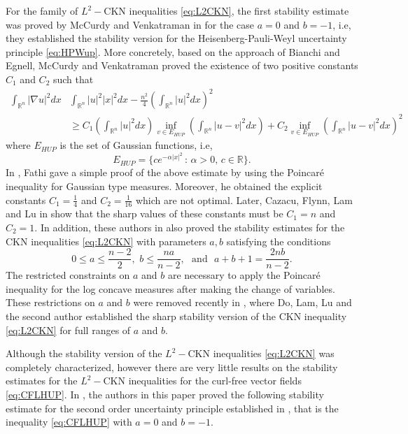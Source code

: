 \documentclass[a4paper,12pt]{article}
\theoremstyle{plain}
\theoremstyle{definition}
\theoremstyle{remark}
\def\R{\mathbb R}%
\def\lt{\left}%
\def\rt{\right}%
\numberwithin{equation}{section}
\begin{document}

For the family of $L^2-$CKN inequalities \eqref{eq:L2CKN}, the first stability estimate was proved by McCurdy and Venkatraman in \cite{MVNonA} for the case $a=0$ and $b=-1$, i.e, they established the stability version for the Heisenberg-Pauli-Weyl uncertainty principle \eqref{eq:HPWup}. More concretely, based on the approach of Bianchi and Egnell, McCurdy and Venkatraman proved the existence of two positive constants $C_1$ and $C_2$ such that
\begin{align*}
\int_{\R^n} |\nabla u|^2 dx &\int_{\R^n} |u|^2 |x|^2 dx - \frac{n^2}4 \lt(\int_{\R^n} |u|^2 dx\rt)^2\\
& \geq C_1 \lt(\int_{\R^n} |u|^2 dx\rt) \inf_{v\in E_{HUP}} \lt(\int_{\R^n} |u -v|^2 dx\rt) + C_2 \inf_{v\in E_{HUP}}\lt(\int_{\R^n} |u-v|^2 dx\rt)^2
\end{align*}
where $E_{HUP}$ is the set of Gaussian functions, i.e, 
\[
E_{HUP}= \{c e^{-\alpha |x|^2}\, :\, \alpha >0, \, c\in \R\}.
\]
In \cite{Fathi}, Fathi gave a simple proof of the above estimate by using the Poincar\'e inequality for Gaussian type measures. Moreover, he obtained the explicit constants $C_1 = \frac14$ and $C_2 = \frac1{16}$ which are not optimal. Later, Cazacu, Flynn, Lam and Lu in \cite{CFLL24} show that the sharp values of these constants must be $C_1 = n$ and $C_2 =1$. In addition, these authors in \cite{CFLL24} also proved the stability estimates for the CKN inequalities \eqref{eq:L2CKN} with parameters $a,b$ satisfying the conditions
\[
0\leq a\leq \frac{n-2}2,\,\, b \leq \frac{na}{n-2},\,\, \text{ and } \,\, a +b + 1 =\frac{2nb}{n-2}.
\] 
The restricted constraints on $a$ and $b$ are necessary to apply the Poincar\'e inequality for the log concave measures after making the change of variables. These restrictions on $a$ and $b$ were removed recently in \cite{DLLN26}, where Do, Lam, Lu and the second author established the sharp stability version of the CKN inequality \eqref{eq:L2CKN} for full ranges of $a$ and $b$. 

Although the stability version of the $L^2-$CKN inequalities \eqref{eq:L2CKN} was completely characterized, however there are very little results on the stability estimates for the $L^2-$CKN inequalities for the curl-free vector fields \eqref{eq:CFLHUP}. In \cite{DNCVPDE}, the authors in this paper proved the following stability estimate for the second order uncertainty principle established in \cite{CFL22}, that is the inequality \eqref{eq:CFLHUP} with  $a =0$ and $b=-1$.
\end{document}
